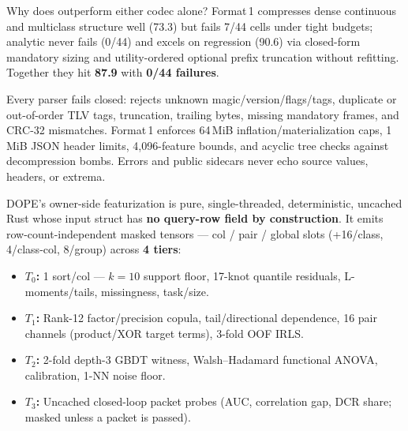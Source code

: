 \documentclass[8.5pt,letterpaper]{article}
\begin{document}
\noindent
\begin{minipage}[t]{0.486\textwidth}
  \vspace{0pt}
  {\fontsize{8.05}{10.0}\selectfont
  Why does  outperform either codec alone? Format\,1 compresses dense continuous and multiclass structure well (73.3) but fails 7/44 cells under tight budgets; analytic  never fails (0/44) and excels on regression (90.6) via closed-form mandatory sizing and utility-ordered optional prefix truncation without refitting. Together they hit \textbf{87.9} with \textbf{0/44 failures}.

  \vspace{2.5pt}
  Every parser fails closed:  rejects unknown magic/version/flags/tags, duplicate or out-of-order TLV tags, truncation, trailing bytes, missing mandatory frames, and CRC-32 mismatches. Format\,1 enforces 64\,MiB inflation/materialization caps, 1\,MiB JSON header limits, 4,096-feature bounds, and acyclic tree checks against decompression bombs. Errors and public sidecars never echo source values, headers, or extrema.
  }
\end{minipage}\hfill
\begin{minipage}[t]{0.486\textwidth}
  \vspace{0pt}
  {\fontsize{8.05}{10.0}\selectfont
  DOPE's owner-side featurization is pure, single-threaded, deterministic, uncached Rust whose input struct has \textbf{no query-row field by construction}. It emits row-count-independent masked tensors --- \textbf{} col / \textbf{} pair / \textbf{} global slots (+16/class, 4/class-col, 8/group) across \textbf{4 tiers}:
  \begin{itemize}[leftmargin=1.12em,itemsep=1.5pt,topsep=2pt]
    \item \textbf{$T_0$:} 1 sort/col --- $k{=}10$ support floor, 17-knot quantile residuals, L-moments/tails, missingness, task/size.
    \item \textbf{$T_1$:} Rank-12 factor/precision copula, tail/directional dependence, 16 pair channels (product/XOR target terms), 3-fold OOF IRLS.
    \item \textbf{$T_2$:} 2-fold depth-3 GBDT witness, Walsh--Hadamard functional ANOVA, calibration, 1-NN noise floor.
    \item \textbf{$T_3$:} Uncached closed-loop packet probes (AUC, correlation gap, DCR share; masked unless a packet is passed).
  \end{itemize}
  }
\end{minipage}
\end{document}
